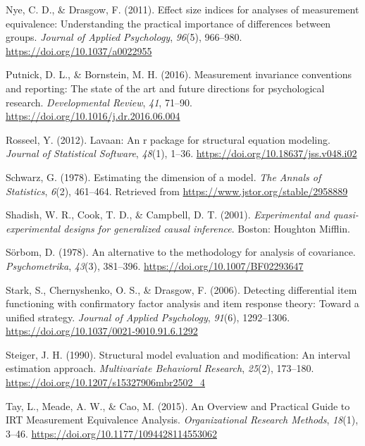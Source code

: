 \documentclass[
  man]{apa6}
\newlength{\cslhangindent}
\newlength{\cslentryspacingunit} %
\newenvironment{CSLReferences}[2] %
 {%
  \setlength{\parindent}{0pt}
  \ifodd #1
  \let\oldpar\par
  \def\par{\hangindent=\cslhangindent\oldpar}
  \fi
  \setlength{\parskip}{#2\cslentryspacingunit}
 }%
 {}
\begin{document}
\begin{CSLReferences}{1}{0}
\leavevmode{}%
Nye, C. D., \& Drasgow, F. (2011). Effect size indices for analyses of measurement equivalence: Understanding the practical importance of differences between groups. \emph{Journal of Applied Psychology}, \emph{96}(5), 966--980. \url{https://doi.org/10.1037/a0022955}

\leavevmode{}%
Putnick, D. L., \& Bornstein, M. H. (2016). Measurement invariance conventions and reporting: The state of the art and future directions for psychological research. \emph{Developmental Review}, \emph{41}, 71--90. \url{https://doi.org/10.1016/j.dr.2016.06.004}

\leavevmode{}%
Rosseel, Y. (2012). Lavaan: An r package for structural equation modeling. \emph{Journal of Statistical Software}, \emph{48}(1), 1--36. \url{https://doi.org/10.18637/jss.v048.i02}

\leavevmode{}%
Schwarz, G. (1978). Estimating the dimension of a model. \emph{The Annals of Statistics}, \emph{6}(2), 461--464. Retrieved from \url{https://www.jstor.org/stable/2958889}

\leavevmode{}%
Shadish, W. R., Cook, T. D., \& Campbell, D. T. (2001). \emph{Experimental and quasi-experimental designs for generalized causal inference}. Boston: Houghton Mifflin.

\leavevmode{}%
Sörbom, D. (1978). An alternative to the methodology for analysis of covariance. \emph{Psychometrika}, \emph{43}(3), 381--396. \url{https://doi.org/10.1007/BF02293647}

\leavevmode{}%
Stark, S., Chernyshenko, O. S., \& Drasgow, F. (2006). Detecting differential item functioning with confirmatory factor analysis and item response theory: Toward a unified strategy. \emph{Journal of Applied Psychology}, \emph{91}(6), 1292--1306. \url{https://doi.org/10.1037/0021-9010.91.6.1292}

\leavevmode{}%
Steiger, J. H. (1990). Structural model evaluation and modification: An interval estimation approach. \emph{Multivariate Behavioral Research}, \emph{25}(2), 173--180. \url{https://doi.org/10.1207/s15327906mbr2502_4}

\leavevmode{}%
Tay, L., Meade, A. W., \& Cao, M. (2015). An Overview and Practical Guide to IRT Measurement Equivalence Analysis. \emph{Organizational Research Methods}, \emph{18}(1), 3--46. \url{https://doi.org/10.1177/1094428114553062}


\end{CSLReferences}
\end{document}
